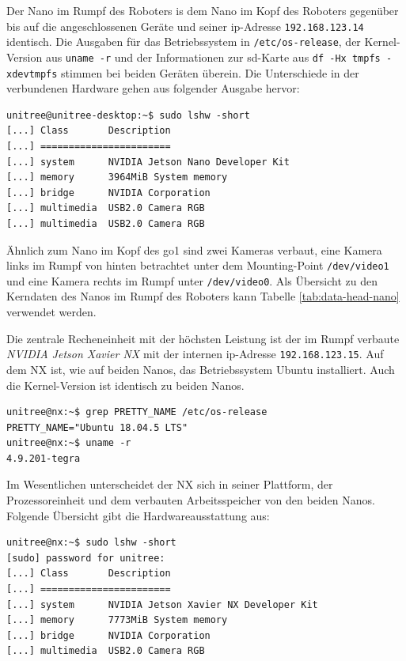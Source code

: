 \label{par:nano-rumpf}

Der Nano im Rumpf des Roboters is dem Nano im Kopf des Roboters gegenüber bis auf die angeschlossenen Geräte und seiner
\gls{ip}-Adresse \texttt{192\allowbreak .168\allowbreak .123\allowbreak .14} identisch.
Die Ausgaben für das Betriebssystem in \texttt{/etc/os-release}, der Kernel-Version aus \texttt{uname -r} und der Informationen
zur \gls{sd}-Karte aus \texttt{df -Hx tmpfs -xdevtmpfs} stimmen bei beiden Geräten überein.
Die Unterschiede in der verbundenen Hardware gehen aus folgender Ausgabe hervor:

\begin{lstlisting}[label=lst:nanos-hardware-rumpf, columns=fixed]
unitree@unitree-desktop:~$ sudo lshw -short
[...] Class       Description
[...] =======================
[...] system      NVIDIA Jetson Nano Developer Kit
[...] memory      3964MiB System memory
[...] bridge      NVIDIA Corporation
[...] multimedia  USB2.0 Camera RGB
[...] multimedia  USB2.0 Camera RGB
\end{lstlisting}

Ähnlich zum Nano im Kopf des \gls{go1} sind zwei Kameras verbaut, eine Kamera links im Rumpf von hinten betrachtet unter dem Mounting-Point
\texttt{/dev/video1} und eine Kamera rechts im Rumpf unter \texttt{/dev/video0}.
Als Übersicht zu den Kerndaten des Nanos im Rumpf des Roboters kann Tabelle \ref{tab:data-head-nano} verwendet werden.

\label{par:nx}

Die zentrale Recheneinheit mit der höchsten Leistung ist der im Rumpf verbaute \emph{NVIDIA Jetson Xavier NX} mit der internen
\gls{ip}-Adresse \texttt{192.168.123.15}.
Auf dem NX ist, wie auf beiden Nanos, das Betriebssystem Ubuntu installiert.
Auch die Kernel-Version ist identisch zu beiden Nanos.

\begin{lstlisting}[label=lst:nx-os]
unitree@nx:~$ grep PRETTY_NAME /etc/os-release
PRETTY_NAME="Ubuntu 18.04.5 LTS"
unitree@nx:~$ uname -r
4.9.201-tegra
\end{lstlisting}

Im Wesentlichen unterscheidet der NX sich in seiner Plattform, der Prozessoreinheit und dem verbauten Arbeitsspeicher
von den beiden Nanos.
Folgende Übersicht gibt die Hardwareausstattung aus:

\begin{lstlisting}[label=lst:nanos-hardware-rumpf-nx, columns=fixed]
unitree@nx:~$ sudo lshw -short
[sudo] password for unitree:
[...] Class       Description
[...] =======================
[...] system      NVIDIA Jetson Xavier NX Developer Kit
[...] memory      7773MiB System memory
[...] bridge      NVIDIA Corporation
[...] multimedia  USB2.0 Camera RGB
\end{lstlisting}

